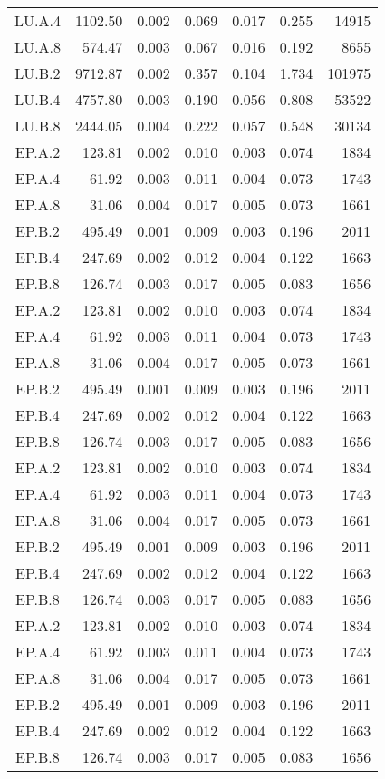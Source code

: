 \begin{longtable}[c]{c*{6}{r}}
  LU.A.4 & 1102.50 & 0.002 & 0.069 & 0.017 & 0.255 & 14915 \\
  LU.A.8 & 574.47 & 0.003 & 0.067 & 0.016 & 0.192 & 8655 \\
  LU.B.2 & 9712.87 & 0.002 & 0.357 & 0.104 & 1.734 & 101975 \\
  LU.B.4 & 4757.80 & 0.003 & 0.190 & 0.056 & 0.808 & 53522 \\
  LU.B.8 & 2444.05 & 0.004 & 0.222 & 0.057 & 0.548 & 30134 \\
  EP.A.2 & 123.81 & 0.002 & 0.010 & 0.003 & 0.074 & 1834 \\
  EP.A.4 & 61.92 & 0.003 & 0.011 & 0.004 & 0.073 & 1743 \\
  EP.A.8 & 31.06 & 0.004 & 0.017 & 0.005 & 0.073 & 1661 \\
  EP.B.2 & 495.49 & 0.001 & 0.009 & 0.003 & 0.196 & 2011 \\
  EP.B.4 & 247.69 & 0.002 & 0.012 & 0.004 & 0.122 & 1663 \\
  EP.B.8 & 126.74 & 0.003 & 0.017 & 0.005 & 0.083 & 1656 \\
  EP.A.2 & 123.81 & 0.002 & 0.010 & 0.003 & 0.074 & 1834 \\
  EP.A.4 & 61.92 & 0.003 & 0.011 & 0.004 & 0.073 & 1743 \\
  EP.A.8 & 31.06 & 0.004 & 0.017 & 0.005 & 0.073 & 1661 \\
  EP.B.2 & 495.49 & 0.001 & 0.009 & 0.003 & 0.196 & 2011 \\
  EP.B.4 & 247.69 & 0.002 & 0.012 & 0.004 & 0.122 & 1663 \\
  EP.B.8 & 126.74 & 0.003 & 0.017 & 0.005 & 0.083 & 1656 \\
  EP.A.2 & 123.81 & 0.002 & 0.010 & 0.003 & 0.074 & 1834 \\
  EP.A.4 & 61.92 & 0.003 & 0.011 & 0.004 & 0.073 & 1743 \\
  EP.A.8 & 31.06 & 0.004 & 0.017 & 0.005 & 0.073 & 1661 \\
  EP.B.2 & 495.49 & 0.001 & 0.009 & 0.003 & 0.196 & 2011 \\
  EP.B.4 & 247.69 & 0.002 & 0.012 & 0.004 & 0.122 & 1663 \\
  EP.B.8 & 126.74 & 0.003 & 0.017 & 0.005 & 0.083 & 1656 \\
  EP.A.2 & 123.81 & 0.002 & 0.010 & 0.003 & 0.074 & 1834 \\
  EP.A.4 & 61.92 & 0.003 & 0.011 & 0.004 & 0.073 & 1743 \\
  EP.A.8 & 31.06 & 0.004 & 0.017 & 0.005 & 0.073 & 1661 \\
  EP.B.2 & 495.49 & 0.001 & 0.009 & 0.003 & 0.196 & 2011 \\
  EP.B.4 & 247.69 & 0.002 & 0.012 & 0.004 & 0.122 & 1663 \\
  EP.B.8 & 126.74 & 0.003 & 0.017 & 0.005 & 0.083 & 1656 \\
  \bottomrule[1.5pt]
\end{longtable}